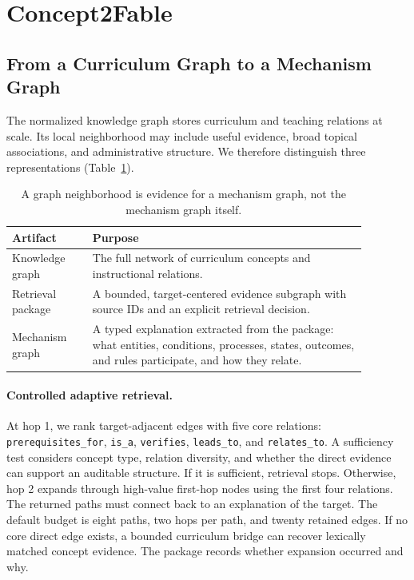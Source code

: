 \documentclass[letterpaper]{article} %
\begin{document}
\section{Concept2Fable}

\subsection{From a Curriculum Graph to a Mechanism Graph}

The normalized knowledge graph stores curriculum and teaching relations at scale. Its local neighborhood may include useful evidence, broad topical associations, and administrative structure. We therefore distinguish three representations (Table~\ref{tab:representations}).

\begin{table}[t]
\centering
\small
\begin{tabular}{p{0.20\linewidth}p{0.68\linewidth}}
\toprule
Artifact & Purpose \\
\midrule
Knowledge graph & The full network of curriculum concepts and instructional relations. \\
Retrieval package & A bounded, target-centered evidence subgraph with source IDs and an explicit retrieval decision. \\
Mechanism graph & A typed explanation extracted from the package: what entities, conditions, processes, states, outcomes, and rules participate, and how they relate. \\
\bottomrule
\end{tabular}
\caption{A graph neighborhood is evidence for a mechanism graph, not the mechanism graph itself.}
\label{tab:representations}
\end{table}

\paragraph{Controlled adaptive retrieval.}
At hop 1, we rank target-adjacent edges with five core relations: \texttt{prerequisites\_for}, \texttt{is\_a}, \texttt{verifies}, \texttt{leads\_to}, and \texttt{relates\_to}. A sufficiency test considers concept type, relation diversity, and whether the direct evidence can support an auditable structure. If it is sufficient, retrieval stops. Otherwise, hop 2 expands through high-value first-hop nodes using the first four relations. The returned paths must connect back to an explanation of the target. The default budget is eight paths, two hops per path, and twenty retained edges. If no core direct edge exists, a bounded curriculum bridge can recover lexically matched concept evidence. The package records whether expansion occurred and why.
\end{document}
